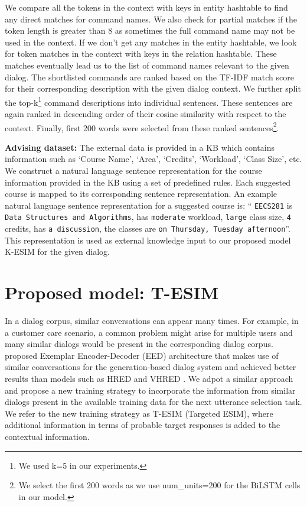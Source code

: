 \documentclass[letterpaper]{article} %
\begin{document}
We compare all the tokens in the context with keys in entity hashtable to find any direct matches for command names. We also check for partial matches if the token length is greater than 8 as sometimes the full command name may not be used in the context. If we don't get any matches in the entity hashtable, we look for token matches in the context with keys in the relation hashtable.
These matches eventually lead us to the list of command names relevant to the given dialog.
The shortlisted commands are ranked based on the TF-IDF match score for their corresponding description with the given dialog context.
We further split the top-k\footnote{We used k=5 in our experiments.} command descriptions into individual sentences. These sentences are again ranked in descending order of their cosine similarity with respect to the context. Finally, first 200 words were selected from these ranked sentences\footnote{We select the first 200 words as we use num\_units=200 for the BiLSTM cells in our model.}.

\textbf{Advising dataset:} The external data is provided in a KB which contains information such as `Course Name', `Area', `Credits', `Workload', `Class Size', etc.
We construct a natural language sentence representation for the course information provided in the KB using a set of predefined rules.
Each suggested course is mapped to its corresponding sentence representation. An example natural language sentence representation for a suggested course is: `` \texttt{EECS281} is \texttt{Data Structures and Algorithms}, has \texttt{moderate} workload,  \texttt{large} class size, \texttt{4} credits, has \texttt{a discussion}, the classes are \texttt{on Thursday, Tuesday afternoon}''. This representation is used as external knowledge input to our proposed model K-ESIM for the given dialog.

\section{Proposed model: T-ESIM}
\label{proposed-model-t-esim}
In a dialog corpus, similar conversations can appear many times. For example, in a customer care scenario, a common problem might arise for multiple users and many similar dialogs would be present in the corresponding dialog corpus. \citeauthor{pandey2018exemplar}  proposed Exemplar Encoder-Decoder (EED) architecture that makes use of similar conversations for the generation-based dialog system and achieved better results than models such as HRED \cite{serban2016building} and VHRED \cite{serban2017hierarchical}. We adpot a similar approach and propose a new training strategy to incorporate the information from similar dialogs present in the available training data for the next utterance selection task. We refer to the new training strategy as T-ESIM (Targeted ESIM), where additional information in terms of probable target responses is added to the contextual information.
\end{document}
